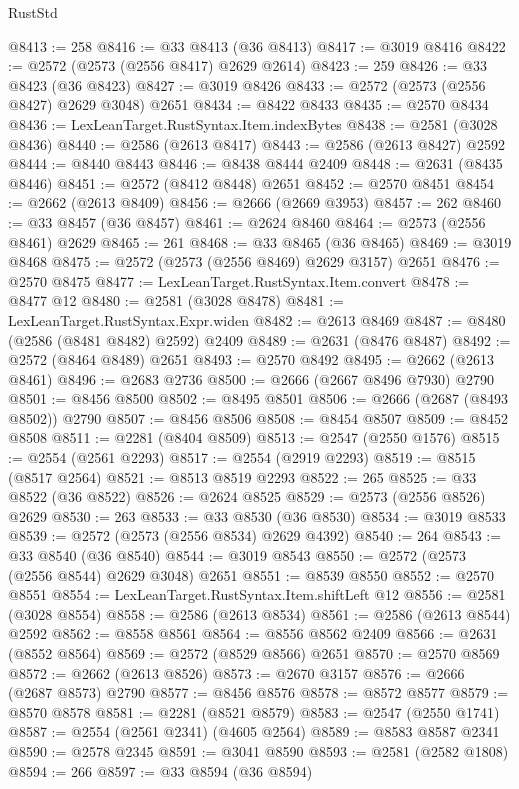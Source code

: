 \begin{lexlean}{RustStd}
\begin{coremodule}
@8413 := 258
@8416 := @33 @8413 (@36 @8413)
@8417 := @3019 @8416
@8422 := @2572 (@2573 (@2556 @8417) @2629 @2614)
@8423 := 259
@8426 := @33 @8423 (@36 @8423)
@8427 := @3019 @8426
@8433 := @2572 (@2573 (@2556 @8427) @2629 @3048) @2651
@8434 := @8422 @8433
@8435 := @2570 @8434
@8436 := LexLeanTarget.RustSyntax.Item.indexBytes
@8438 := @2581 (@3028 @8436)
@8440 := @2586 (@2613 @8417)
@8443 := @2586 (@2613 @8427) @2592
@8444 := @8440 @8443
@8446 := @8438 @8444 @2409
@8448 := @2631 (@8435 @8446)
@8451 := @2572 (@8412 @8448) @2651
@8452 := @2570 @8451
@8454 := @2662 (@2613 @8409)
@8456 := @2666 (@2669 @3953)
@8457 := 262
@8460 := @33 @8457 (@36 @8457)
@8461 := @2624 @8460
@8464 := @2573 (@2556 @8461) @2629
@8465 := 261
@8468 := @33 @8465 (@36 @8465)
@8469 := @3019 @8468
@8475 := @2572 (@2573 (@2556 @8469) @2629 @3157) @2651
@8476 := @2570 @8475
@8477 := LexLeanTarget.RustSyntax.Item.convert
@8478 := @8477 @12
@8480 := @2581 (@3028 @8478)
@8481 := LexLeanTarget.RustSyntax.Expr.widen
@8482 := @2613 @8469
@8487 := @8480 (@2586 (@8481 @8482) @2592) @2409
@8489 := @2631 (@8476 @8487)
@8492 := @2572 (@8464 @8489) @2651
@8493 := @2570 @8492
@8495 := @2662 (@2613 @8461)
@8496 := @2683 @2736
@8500 := @2666 (@2667 @8496 @7930) @2790
@8501 := @8456 @8500
@8502 := @8495 @8501
@8506 := @2666 (@2687 (@8493 @8502)) @2790
@8507 := @8456 @8506
@8508 := @8454 @8507
@8509 := @8452 @8508
@8511 := @2281 (@8404 @8509)
@8513 := @2547 (@2550 @1576)
@8515 := @2554 (@2561 @2293)
@8517 := @2554 (@2919 @2293)
@8519 := @8515 (@8517 @2564)
@8521 := @8513 @8519 @2293
@8522 := 265
@8525 := @33 @8522 (@36 @8522)
@8526 := @2624 @8525
@8529 := @2573 (@2556 @8526) @2629
@8530 := 263
@8533 := @33 @8530 (@36 @8530)
@8534 := @3019 @8533
@8539 := @2572 (@2573 (@2556 @8534) @2629 @4392)
@8540 := 264
@8543 := @33 @8540 (@36 @8540)
@8544 := @3019 @8543
@8550 := @2572 (@2573 (@2556 @8544) @2629 @3048) @2651
@8551 := @8539 @8550
@8552 := @2570 @8551
@8554 := LexLeanTarget.RustSyntax.Item.shiftLeft @12
@8556 := @2581 (@3028 @8554)
@8558 := @2586 (@2613 @8534)
@8561 := @2586 (@2613 @8544) @2592
@8562 := @8558 @8561
@8564 := @8556 @8562 @2409
@8566 := @2631 (@8552 @8564)
@8569 := @2572 (@8529 @8566) @2651
@8570 := @2570 @8569
@8572 := @2662 (@2613 @8526)
@8573 := @2670 @3157
@8576 := @2666 (@2687 @8573) @2790
@8577 := @8456 @8576
@8578 := @8572 @8577
@8579 := @8570 @8578
@8581 := @2281 (@8521 @8579)
@8583 := @2547 (@2550 @1741)
@8587 := @2554 (@2561 @2341) (@4605 @2564)
@8589 := @8583 @8587 @2341
@8590 := @2578 @2345
@8591 := @3041 @8590
@8593 := @2581 (@2582 @1808)
@8594 := 266
@8597 := @33 @8594 (@36 @8594)

\end{coremodule}
\end{lexlean}
